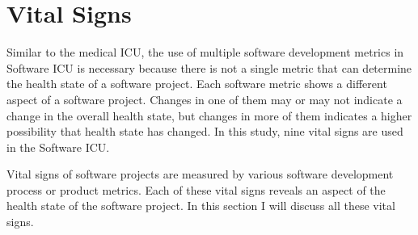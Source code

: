 \section{Vital Signs}
\label{vitalSign}

Similar to the medical ICU, the use of multiple software development metrics in Software ICU is necessary because there is not a single metric that can determine the health state of a software project. Each software metric shows a different aspect of a software project. Changes in one of them may or may not indicate a change in the overall health state, but changes in more of them indicates a higher possibility that health state has changed. In this study, nine vital signs are used in the Software ICU.

Vital signs of software projects are measured by various software development process or product metrics. Each of these vital signs reveals an aspect of the health state of the software project. In this section I will discuss all these vital signs.

